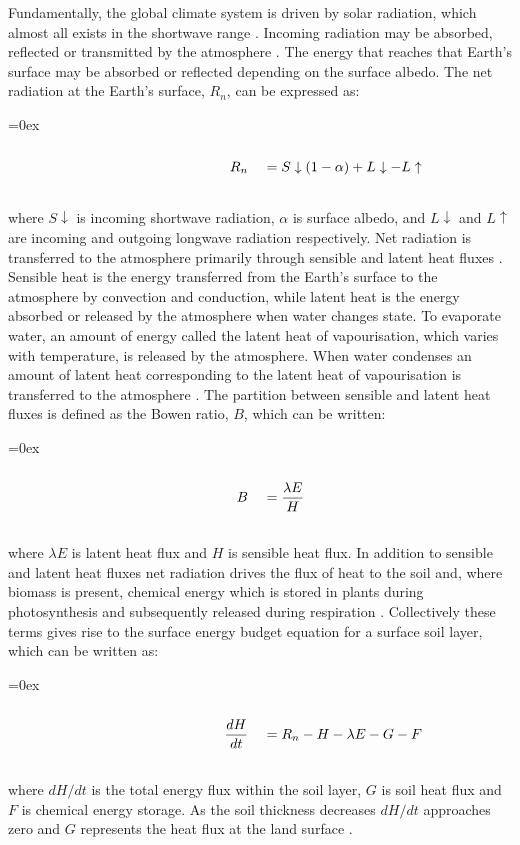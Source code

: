 \documentclass{icldt}\usepackage[]{graphicx}\usepackage[]{color}
\def\leftalgn{0.45}\def\rightalgn{0.45}
\def\algnrow{\rule{\leftalgn\textwidth}{0ex}&\rule{\rightalgn\textwidth}{0ex}}
\newenvironment{algneqn}{%
  \arraycolsep=0ex\renewcommand\arraystretch{0}%
  \begin{equation}%
  \begin{array}{rl}%
  \algnrow\\}%
 {\\\algnrow%
  \end{array}%
  \end{equation}\ignorespacesafterend%
}
\begin{document}
Fundamentally, the global climate system is driven by solar radiation, which almost all exists in the shortwave range \citep{Barry2010}. Incoming radiation may be absorbed, reflected or transmitted by the atmosphere \citep{Pitman2003,Seneviratne2010,Barry2010}. The energy that reaches that Earth's surface may be absorbed or reflected depending on the surface albedo. The net radiation at the Earth's surface, $ R_{n} $, can be expressed as:

\begin{algneqn} \label{eq:netradiation}
R_{n}\ &= S \downarrow (1 - \alpha) + L \downarrow - L \uparrow
\end{algneqn}

\noindent where $ S \downarrow $ is incoming shortwave radiation, $ \alpha $ is surface albedo, and $ L \downarrow $ and $ L \uparrow $ are incoming and outgoing longwave radiation respectively. Net radiation is transferred to the atmosphere primarily through sensible and latent heat fluxes \citep{Pitman2003}. Sensible heat is the energy transferred from the Earth's surface to the atmosphere by convection and conduction, while latent heat is the energy absorbed or released by the atmosphere when water changes state. To evaporate water, an amount of energy called the latent heat of vapourisation, which varies with temperature, is released by the atmosphere. When water condenses an amount of latent heat corresponding to the latent heat of vapourisation is transferred to the atmosphere \citep{Barry2010}. The partition between sensible and latent heat fluxes is defined as the Bowen ratio, $ B $, which can be written:

\begin{algneqn}
B\ &= \dfrac{\lambda E}{H}
\end{algneqn}

\noindent where $ \lambda E $ is latent heat flux and $ H $ is sensible heat flux. In addition to sensible and latent heat fluxes net radiation drives the flux of heat to the soil and, where biomass is present, chemical energy which is stored in plants during photosynthesis and subsequently released during respiration \citep{Barry2010}. Collectively these terms gives rise to the surface energy budget equation for a surface soil layer, which can be written as:

\begin{algneqn} \label{eq:energybudget}
\dfrac{dH}{dt}\ &= R_{n} - H - \lambda E - G - F
\end{algneqn} 

\noindent where $ dH / dt $ is the total energy flux within the soil layer, $ G $ is soil heat flux and $ F $ is chemical energy storage. As the soil thickness decreases $ dH / dt $ approaches zero and $ G $ represents the heat flux at the land surface \citep{Seneviratne2010}. \\
\end{document}
